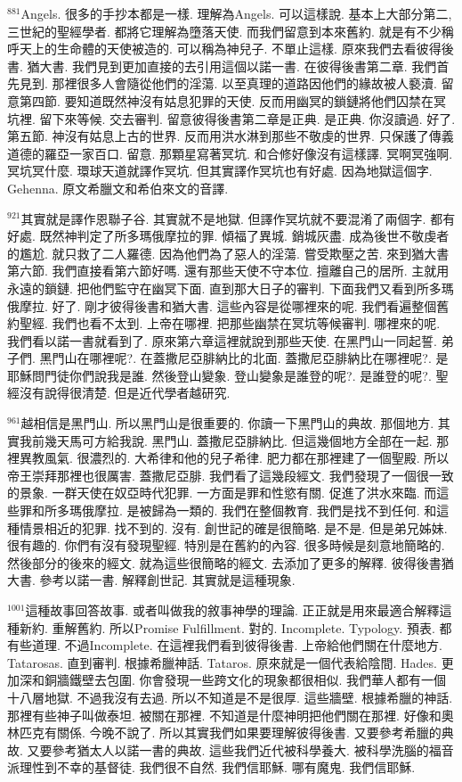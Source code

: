 \documentclass{book}
\begin{document}
$^{881}$Angels.
很多的手抄本都是一樣.
理解為Angels.
可以這樣說.
基本上大部分第二,三世紀的聖經學者.
都將它理解為墮落天使.
而我們留意到本來舊約.
就是有不少稱呼天上的生命體的天使被造的.
可以稱為神兒子.
不單止這樣.
原來我們去看彼得後書.
猶大書.
我們見到更加直接的去引用這個以諾一書.
在彼得後書第二章.
我們首先見到.
那裡很多人會隨從他們的淫蕩.
以至真理的道路因他們的緣故被人褻瀆.
留意第四節.
要知道既然神沒有姑息犯罪的天使.
反而用幽冥的鎖鏈將他們囚禁在冥坑裡.
留下來等候.
交去審判.
留意彼得後書第二章是正典.
是正典.
你沒讀過.
好了.
第五節.
神沒有姑息上古的世界.
反而用洪水淋到那些不敬虔的世界.
只保護了傳義道德的羅亞一家百口.
留意.
那顆星寫著冥坑.
和合修好像沒有這樣譯.
冥啊冥強啊.
冥坑冥什麼.
環球天道就譯作冥坑.
但其實譯作冥坑也有好處.
因為地獄這個字.
Gehenna.
原文希臘文和希伯來文的音譯.

$^{921}$其實就是譯作恩聯子谷.
其實就不是地獄.
但譯作冥坑就不要混淆了兩個字.
都有好處.
既然神判定了所多瑪俄摩拉的罪.
傾福了異城.
銷城灰盡.
成為後世不敬虔者的尷尬.
就只救了二人羅德.
因為他們為了惡人的淫蕩.
嘗受欺壓之苦.
來到猶大書第六節.
我們直接看第六節好嗎.
還有那些天使不守本位.
擅離自己的居所.
主就用永遠的鎖鏈.
把他們監守在幽冥下面.
直到那大日子的審判.
下面我們又看到所多瑪俄摩拉.
好了.
剛才彼得後書和猶大書.
這些內容是從哪裡來的呢.
我們看遍整個舊約聖經.
我們也看不太到.
上帝在哪裡.
把那些幽禁在冥坑等候審判.
哪裡來的呢.
我們看以諾一書就看到了.
原來第六章這裡就說到那些天使.
在黑門山一同起誓.
弟子們.
黑門山在哪裡呢?.
在蓋撒尼亞腓納比的北面.
蓋撒尼亞腓納比在哪裡呢?.
是耶穌問門徒你們說我是誰.
然後登山變象.
登山變象是誰登的呢?.
是誰登的呢?.
聖經沒有說得很清楚.
但是近代學者越研究.

$^{961}$越相信是黑門山.
所以黑門山是很重要的.
你讀一下黑門山的典故.
那個地方.
其實我前幾天馬可方給我說.
黑門山.
蓋撒尼亞腓納比.
但這幾個地方全部在一起.
那裡異教風氣.
很濃烈的.
大希律和他的兒子希律.
肥力都在那裡建了一個聖殿.
所以帝王崇拜那裡也很厲害.
蓋撒尼亞腓.
我們看了這幾段經文.
我們發現了一個很一致的景象.
一群天使在奴亞時代犯罪.
一方面是罪和性慾有關.
促進了洪水來臨.
而這些罪和所多瑪俄摩拉.
是被歸為一類的.
我們在整個教育.
我們是找不到任何.
和這種情景相近的犯罪.
找不到的.
沒有.
創世記的確是很簡略.
是不是.
但是弟兄姊妹.
很有趣的.
你們有沒有發現聖經.
特別是在舊約的內容.
很多時候是刻意地簡略的.
然後部分的後來的經文.
就為這些很簡略的經文.
去添加了更多的解釋.
彼得後書猶大書.
參考以諾一書.
解釋創世記.
其實就是這種現象.

$^{1001}$這種故事回答故事.
或者叫做我的敘事神學的理論.
正正就是用來最適合解釋這種新約.
重解舊約.
所以Promise Fulfillment.
對的.
Incomplete.
Typology.
預表.
都有些道理.
不過Incomplete.
在這裡我們看到彼得後書.
上帝給他們關在什麼地方.
Tatarosas.
直到審判.
根據希臘神話.
Tataros.
原來就是一個代表給陰間.
Hades.
更加深和銅牆鐵壁去包圍.
你會發現一些跨文化的現象都很相似.
我們華人都有一個十八層地獄.
不過我沒有去過.
所以不知道是不是很厚.
這些牆壁.
根據希臘的神話.
那裡有些神子叫做泰坦.
被關在那裡.
不知道是什麼神明把他們關在那裡.
好像和奧林匹克有關係.
今晚不說了.
所以其實我們如果要理解彼得後書.
又要參考希臘的典故.
又要參考猶太人以諾一書的典故.
這些我們近代被科學養大.
被科學洗腦的福音派理性到不幸的基督徒.
我們很不自然.
我們信耶穌.
哪有魔鬼.
我們信耶穌.
\end{document}
